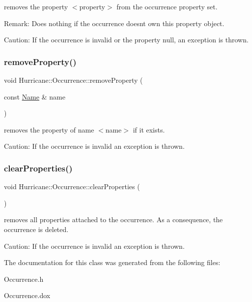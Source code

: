 removes the property {\ttfamily $<$property$>$} from the occurrence property set.

\begin{DoxyParagraph}{Remark\+: Does nothing if the occurrence doesn\textquotesingle{}t own this property }
object.
\end{DoxyParagraph}
\begin{DoxyParagraph}{Caution\+: If the occurrence is invalid or the property null, an }
exception is thrown. 
\end{DoxyParagraph}
\mbox{\label{classHurricane_1_1Occurrence_a8d86755bf50cbc7fd2849b039a372b0a}} 
\subsubsection{\texorpdfstring{remove\+Property()}{removeProperty()}}
{\footnotesize\ttfamily void Hurricane\+::\+Occurrence\+::remove\+Property (\begin{DoxyParamCaption}\item[{const \mbox{\hyperlink{classHurricane_1_1Name}{Name}} \&}]{name }\end{DoxyParamCaption})}

removes the property of name {\ttfamily $<$name$>$} if it exists.

\begin{DoxyParagraph}{Caution\+: If the occurrence is invalid an exception is thrown. }

\end{DoxyParagraph}
\mbox{\label{classHurricane_1_1Occurrence_ae9b269d39f3f68645d6d396d7ab5d8b7}} 
\subsubsection{\texorpdfstring{clear\+Properties()}{clearProperties()}}
{\footnotesize\ttfamily void Hurricane\+::\+Occurrence\+::clear\+Properties (\begin{DoxyParamCaption}{ }\end{DoxyParamCaption})}

removes all properties attached to the occurrence. As a consequence, the occurrence is deleted.

\begin{DoxyParagraph}{Caution\+: If the occurrence is invalid an exception is thrown. }

\end{DoxyParagraph}


The documentation for this class was generated from the following files\+:\begin{DoxyCompactItemize}
\item 
Occurrence.\+h\item 
Occurrence.\+dox\end{DoxyCompactItemize}
